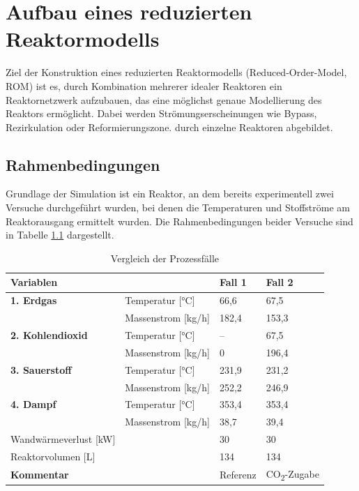 \chapter{Aufbau eines reduzierten Reaktormodells}
    Ziel der Konstruktion eines reduzierten Reaktormodells (Reduced-Order-Model, ROM) ist es, durch Kombination mehrerer idealer Reaktoren ein Reaktornetzwerk aufzubauen, das eine möglichst genaue Modellierung des Reaktors ermöglicht. Dabei werden Strömungserscheinungen wie Bypass, Rezirkulation oder Reformierungszone. durch einzelne Reaktoren abgebildet. 
\iffalse
    \section{Rahmenbedingungen}
        Grundlage der Simulation ist ein Reaktor, an dem bereits experimentell zwei Versuche durchgeführt wurden, bei denen die Temperaturen und Stoffströme am Reaktorausgang ermittelt wurden. Die Rahmenbedingungen beider Versuche sind in Tabelle \ref{tab:rahmenbedingungen_versuche} dargestellt.
        \begin{table}[H]
            \centering
            \caption{Vergleich der Prozessfälle \cite{gonzales}}
            \begin{tabular}{llll}
            \toprule
            \textbf{Variablen} & & \textbf{Fall 1} & \textbf{Fall 2} \\
            \midrule
            \textbf{1. Erdgas} & Temperatur [°C] & 66,6 & 67,5 \\
                               & Massenstrom [kg/h] & 182,4 & 153,3 \\
            \midrule
            \textbf{2. Kohlendioxid} & Temperatur [°C] & -- & 67,5 \\
                                     & Massenstrom [kg/h] & 0 & 196,4 \\
            \midrule
            \textbf{3. Sauerstoff} & Temperatur [°C] & 231,9 & 231,2 \\
                                   & Massenstrom [kg/h] & 252,2 & 246,9 \\
            \midrule
            \textbf{4. Dampf} & Temperatur [°C] & 353,4 & 353,4 \\
                              & Massenstrom [kg/h] & 38,7 & 39,4 \\
            \midrule
            Wandwärmeverlust [kW] & & 30 & 30 \\
            Reaktorvolumen [L] & & 134 & 134 \\
            \midrule
            \textbf{Kommentar} & & Referenz & CO\textsubscript{2}-Zugabe \\
            \bottomrule
            \end{tabular}
            \label{tab:rahmenbedingungen_versuche}
        \end{table}

